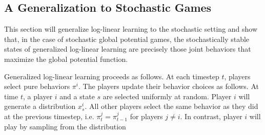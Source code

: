 \subsection{A Generalization to Stochastic Games}

This section will generalize log-linear learning to the stochastic setting and show that, in the case of stochastic global potential games, the stochastically stable states of generalized log-linear learning are precisely those joint behaviors that maximize the global potential function. 

Generalized log-linear learning proceeds as follows. At each timestep $t$, players select pure behaviors $\pi^i$. The players update their behavior choices as follows. At time $t$, a player $i$ and a state $s$ are selected uniformly at random. Player $i$ will generate a distribution $x^i_s$. All other players select the same behavior as they did at the previous timestep, i.e. $\pi_t^j = \pi_{t-1}^j$ for players $j \neq i$. In contrast, player $i$ will play by sampling from the distribution


